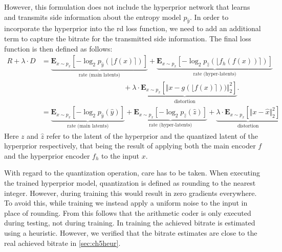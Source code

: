 However, this formulation does not include the hyperprior network that learns and transmits side information about the entropy model $p_{\hat{y}}$. In order to incorporate the hyperprior into the \ac{rd} loss function, we need to add an additional term to capture the bitrate for the transmitted side information. The final loss function is then defined as follows:
\begin{align*}
R + \lambda \cdot D &= \underbrace{\mathbf{E}_{x\sim p_x} [ -\log_2 p_{\hat{y}}(\lfloor f(x)\rceil)]}_\text{rate (main latents)} + 
\underbrace{\mathbf{E}_{x\sim p_x} [ -\log_2 p_{\hat{z}}(\lfloor f_h(f(x))\rceil)]}_\text{rate (hyper-latents)}\\ 
&\qquad\qquad\qquad\qquad\qquad\quad\:\: + \underbrace{\lambda \cdot\mathbf{E}_{x\sim p_x} [\Vert x - g(\lfloor f(x)\rceil))\Vert^2_2]}_\text{distortion}.\\
&=\underbrace{\mathbf{E}_{x\sim p_x} [ -\log_2 p_{\hat{y}}(\hat{y})]}_\text{rate (main latents)} + 
\underbrace{\mathbf{E}_{x\sim p_x} [ -\log_2 p_{\hat{z}}(\hat{z})]}_\text{rate (hyper-latents)} + \underbrace{\lambda \cdot\mathbf{E}_{x\sim p_x} [\Vert x - \hat{x}\Vert^2_2]}_\text{distortion}
\end{align*}
Here $z$ and $\hat{z}$ refer to the latent of the hyperprior and the quantized latent of the hyperprior respectively, that being the result of applying both the main encoder $f$ and the hyperprior encoder $f_h$ to the input $x$.

With regard to the quantization operation, care has to be taken. When executing the trained hyperprior model, quantization is defined as rounding to the nearest integer. However, during training this would result in zero gradients everywhere. To avoid this, while training we instead apply a uniform noise to the input in place of rounding. From this follows that the arithmetic coder is only executed during testing, not during training. In training the achieved bitrate is estimated using a heuristic. However, we verified that the bitrate estimates are close to the real achieved bitrate in \autoref{sec:ch5heur}.
